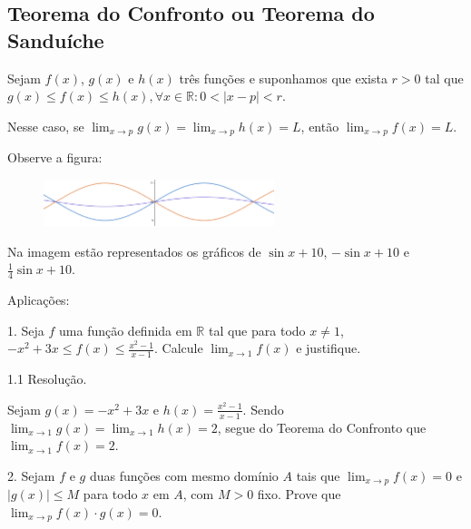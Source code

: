 \documentclass{article}
\begin{document}
{\begin{newpage}
\subsection{Teorema do Confronto ou Teorema do Sanduíche}
\par
\hspace{12pt}Sejam $f(x)$, $g(x)$ e $h(x)$ três funções e suponhamos que exista $r>0$ tal que $g(x)\leq f(x) \leq h(x), \forall x\in\mathbb{R}: 0 < | x-p | < r$.
\par Nesse caso, se $\displaystyle{\lim_{x\to p} g(x) = \lim_{x\to p} h(x) = L}$, então $\displaystyle{\lim_{x\to p}} f(x) =L$.
\par Observe a figura:
\begin{figure}[htbp]
\begin{center}
\includegraphics[width=0.6\textwidth, angle=0]{Grafico.png}
\end{center}
\end{figure}
\vspace{0.3cm}
\par Na imagem estão representados os gráficos de $\sin{x} + 10$, $-\sin{x} + 10$ e $\frac{1}{4}\sin{x} + 10$.
\par
\vspace{0.3cm}
\begin{flushleft}
Aplicações:
\par
\vspace{0.3cm}
1. Seja $f$ uma função definida em $\mathbb{R}$ tal que para todo $x\neq 1$, $-x^2 + 3x\leq f(x)\leq \frac{x^2 - 1}{x-1}$. Calcule $\displaystyle{\lim_{x\to 1}} f(x)$ e justifique.
\par
\vspace{0.3cm}
1.1 Resolução.
\end{flushleft}
\par Sejam $g(x)=-x^2 + 3x$ e $h(x)=\frac{x^2 - 1}{x-1}$. Sendo $\displaystyle{\lim_{x\to 1} g(x) = \lim_{x\to 1}} h(x) =2$, segue do Teorema do Confronto que $\displaystyle{\lim_{x\to 1}} f(x) = 2$.
\par
\vspace{0.3cm}
\begin{flushleft}
2. Sejam $f$ e $g$ duas funções com mesmo domínio $A$ tais que $\displaystyle{\lim_{x\to p}} f(x) = 0$ e $|g(x)|\leq M$ para todo $x$ em $A$, com $M>0$ fixo. Prove que $\displaystyle{\lim_{x\to p}} f(x)\cdot g(x) = 0$.

\end{flushleft}
\end{newpage}}
\end{document}
